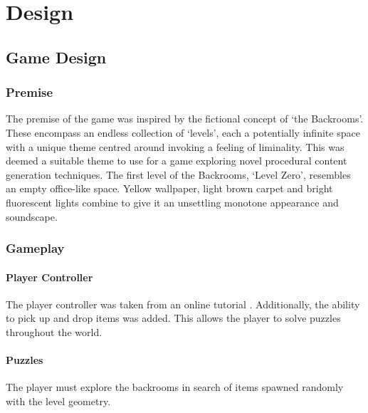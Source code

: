 \chapter{Design}
\section{Game Design}
\subsection{Premise}
The premise of the game was inspired by the fictional concept of `the Backrooms'. These encompass an endless collection of `levels', each a potentially infinite space with a unique theme centred around invoking a feeling of liminality. This was deemed a suitable theme to use for a game exploring novel procedural content generation techniques. The first level of the Backrooms, `Level Zero', resembles an empty office-like space. Yellow wallpaper, light brown carpet and bright fluorescent lights combine to give it an unsettling monotone appearance and soundscape.


\subsection{Gameplay}
\subsubsection{Player Controller}
The player controller was taken from an online tutorial \cite{FPS_controller_YouTube, FPS_controller_GitHub}. Additionally, the ability to pick up and drop items was added. This allows the player to solve puzzles throughout the world.

\subsubsection{Puzzles}
The player must explore the backrooms in search of items spawned randomly with the level geometry.

